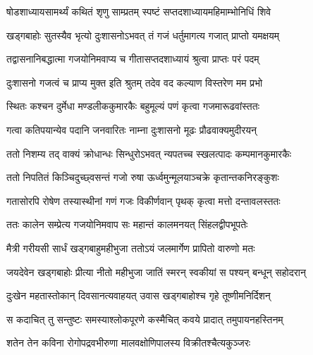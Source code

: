\genMangalaShloka

\closesub

\ganapatyadiDhyanam
\padmaPuranam



\twolineshloka
{षोडशाध्यायसामर्थ्यं कथितं शृणु साम्प्रतम्}
{स्पष्टं सप्तदशाध्यायमहिमाम्भोनिधिं शिवे} %

\twolineshloka
{खड्गबाहोः सुतस्यैव भृत्यो दुःशासनोऽभवत्}
{तं गजं धर्तुमागत्य गजात् प्राप्तो यमक्षयम्} %

\twolineshloka
{तद्वासनानिबद्धात्मा गजयोनिमवाप्य च}
{गीतासप्तदशाध्यायं श्रुत्वा प्राप्तः परं पदम्} %


\twolineshloka
{दुःशासनो गजत्वं च प्राप्य मुक्त इति श्रुतम्}
{तदेव वद कल्याण विस्तरेण मम प्रभो} %


\twolineshloka
{स्थितः कश्चन दुर्मेधा मण्डलीककुमारकैः}
{बहुमूल्यं पणं कृत्वा गजमारूढवांस्ततः} %

\twolineshloka
{गत्वा कतिपयान्येव पदानि जनवारितः}
{नाम्ना दुःशासनो मूढः प्रौढवाक्यमुदीरयन्} %

\twolineshloka
{ततो निशम्य तद् वाक्यं क्रोधान्धः सिन्धुरोऽभवत्}
{न्यपतच्च स्खलत्पादः कम्पमानकुमारकैः} %

\twolineshloka
{ततो निपतितं किञ्चिदुच्छ्वसन्तं गजो रुषा}
{ऊर्ध्वमुन्मूलयाञ्चक्रे कृतान्तकनिरङ्कुशः} %

\twolineshloka
{गतासोरपि रोषेण तस्यास्थीनां गणं गजः}
{विकीर्णवान् पृथक् कृत्वा मत्तो दन्तावलस्ततः} %

\twolineshloka
{ततः कालेन सम्प्रेत्य गजयोनिमवाप सः}
{महान्तं कालमनयत् सिंहलद्वीपभूपतेः} %

\twolineshloka
{मैत्री गरीयसी सार्धं खड्गबाहुमहीभुजा}
{ततोऽयं जलमार्गेण प्रापितो वारुणो मतः} %

\twolineshloka
{जयदेवेन खड्गबाहोः प्रीत्या नीतो महीभुजा}
{जातिं स्मरन् स्वकीयां स पश्यन् बन्धून् सहोदरान्} %

\twolineshloka
{दुःखेन महतास्तोकान् दिवसानत्यवाहयत्}
{उवास खड्गबाहोश्च गृहे तूष्णीमनिर्दिशन्} %

\twolineshloka
{स कदाचित् तु सन्तुष्टः समस्याश्लोकपूरणे}
{कस्मैचित् कवये प्रादात् तमुपायनहस्तिनम्} %

\twolineshloka
{शतेन तेन कविना रोगोपद्रवभीरुणा}
{मालवक्षोणिपालस्य विक्रीतश्चैत्यकुञ्जरः} %

